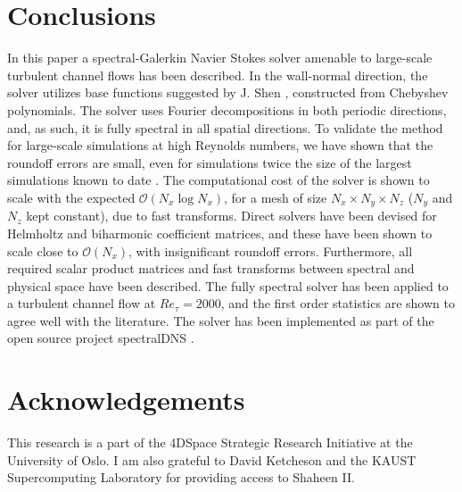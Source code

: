 \documentclass[preprint]{elsarticle}
\begin{document}
\section{Conclusions}
In this paper a spectral-Galerkin Navier Stokes solver amenable to large-scale turbulent channel flows 
has been described. In the wall-normal direction, the solver utilizes base 
functions 
suggested by J. Shen \cite{Shen95}, constructed from Chebyshev polynomials. The 
solver uses Fourier decompositions in both periodic directions, and, as such, 
it is fully spectral in all spatial directions. To validate the method for large-scale simulations at high Reynolds numbers, we have shown 
that the roundoff errors are small, even for simulations twice the size of the 
largest simulations known to date \cite{leemoser15}.
The computational cost of the solver is shown to scale with the expected 
$\mathcal{O}(N_x \log N_x)$, for a mesh of size $N_x \times N_y \times N_z$ ($N_y$ and $N_z$ kept constant), due to fast 
transforms. Direct 
solvers have been devised for Helmholtz and biharmonic coefficient matrices, 
and these have been shown to scale close to 
$\mathcal{O}(N_x)$, with insignificant roundoff errors. Furthermore, all required scalar product matrices and fast transforms between spectral and physical space have been described. The fully spectral solver 
has been applied to a turbulent 
channel flow at $Re_{\tau}=2000$, and the first order statistics are shown to agree well with the literature. The solver has been implemented as part of the open source project spectralDNS \cite{spectralDNS}.

\section*{Acknowledgements}
This research is a part of the 4DSpace Strategic Research Initiative at the University of Oslo. I am also grateful to David Ketcheson and the KAUST Supercomputing Laboratory for providing access to Shaheen II.
\end{document}
